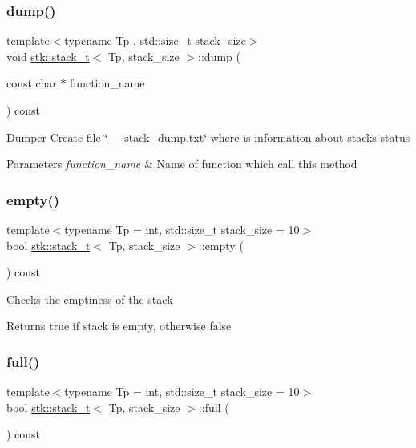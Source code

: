 \subsubsection{\texorpdfstring{dump()}{dump()}}
{\footnotesize\ttfamily template$<$typename Tp , std\+::size\+\_\+t stack\+\_\+size$>$ \\
void \hyperlink{classstk_1_1stack__t}{stk\+::stack\+\_\+t}$<$ Tp, stack\+\_\+size $>$\+::dump (\begin{DoxyParamCaption}\item[{const char $\ast$}]{function\+\_\+name }\end{DoxyParamCaption}) const\hspace{0.3cm}{\ttfamily [private]}}

Dumper Create file \char`\"{}\+\_\+\+\_\+stack\+\_\+dump.\+txt\char`\"{} where is information about stack\textquotesingle{}s status 
\begin{DoxyParams}{Parameters}
{\em function\+\_\+name} & Name of function which call this method \\
\hline
\end{DoxyParams}
\mbox{\label{classstk_1_1stack__t_adb144d5de96aeeed6dee8d902158f1a6}} 
\subsubsection{\texorpdfstring{empty()}{empty()}}
{\footnotesize\ttfamily template$<$typename Tp  = int, std\+::size\+\_\+t stack\+\_\+size = 10$>$ \\
bool \hyperlink{classstk_1_1stack__t}{stk\+::stack\+\_\+t}$<$ Tp, stack\+\_\+size $>$\+::empty (\begin{DoxyParamCaption}{ }\end{DoxyParamCaption}) const\hspace{0.3cm}{\ttfamily [inline]}}

Checks the emptiness of the stack \begin{DoxyReturn}{Returns}
true if stack is empty, otherwise false 
\end{DoxyReturn}
\mbox{\label{classstk_1_1stack__t_a62b9e32ef2b123939b4c21175b5fc036}} 
\subsubsection{\texorpdfstring{full()}{full()}}
{\footnotesize\ttfamily template$<$typename Tp  = int, std\+::size\+\_\+t stack\+\_\+size = 10$>$ \\
bool \hyperlink{classstk_1_1stack__t}{stk\+::stack\+\_\+t}$<$ Tp, stack\+\_\+size $>$\+::full (\begin{DoxyParamCaption}{ }\end{DoxyParamCaption}) const\hspace{0.3cm}{\ttfamily [inline]}}

